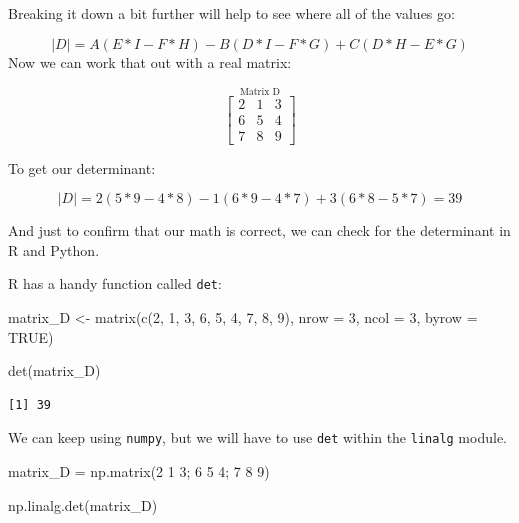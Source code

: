 \documentclass[
  letterpaper,
]{krantz}
\newenvironment{Shaded}{}{}
\newcommand{\AttributeTok}[1]{\textcolor[rgb]{0.49,0.56,0.16}{#1}}
\newcommand{\ConstantTok}[1]{\textcolor[rgb]{0.53,0.00,0.00}{#1}}
\newcommand{\DecValTok}[1]{\textcolor[rgb]{0.25,0.63,0.44}{#1}}
\newcommand{\FunctionTok}[1]{\textcolor[rgb]{0.02,0.16,0.49}{#1}}
\newcommand{\NormalTok}[1]{#1}
\newcommand{\OperatorTok}[1]{\textcolor[rgb]{0.40,0.40,0.40}{#1}}
\newcommand{\OtherTok}[1]{\textcolor[rgb]{0.00,0.44,0.13}{#1}}
\newcommand{\StringTok}[1]{\textcolor[rgb]{0.25,0.44,0.63}{#1}}
\begin{document}
Breaking it down a bit further will help to see where all of the values
go:

\[
\mid D \mid = A(E*I - F*H) - B(D*I - F*G) + C(D*H - E*G)
\] Now we can work that out with a real matrix:

\[
\stackrel{\mbox{Matrix D}}{
\begin{bmatrix}
2 & 1 & 3\\
6 & 5 & 4\\
7 & 8 & 9
\end{bmatrix}
}
\]

To get our determinant:

\[
\mid D \mid = 2(5*9 - 4*8) - 1(6*9 - 4*7) + 3(6*8 - 5*7) = 39
\]

And just to confirm that our math is correct, we can check for the
determinant in R and Python.

R has a handy function called \texttt{det}:

\begin{Shaded}
\begin{Highlighting}[]
\NormalTok{matrix\_D }\OtherTok{\textless{}{-}} \FunctionTok{matrix}\NormalTok{(}\FunctionTok{c}\NormalTok{(}\DecValTok{2}\NormalTok{, }\DecValTok{1}\NormalTok{, }\DecValTok{3}\NormalTok{,}
                     \DecValTok{6}\NormalTok{, }\DecValTok{5}\NormalTok{, }\DecValTok{4}\NormalTok{,}
                     \DecValTok{7}\NormalTok{, }\DecValTok{8}\NormalTok{, }\DecValTok{9}\NormalTok{), }
                   \AttributeTok{nrow =} \DecValTok{3}\NormalTok{, }
                   \AttributeTok{ncol =} \DecValTok{3}\NormalTok{, }
                   \AttributeTok{byrow =} \ConstantTok{TRUE}\NormalTok{)}

\FunctionTok{det}\NormalTok{(matrix\_D)}
\end{Highlighting}
\end{Shaded}

\begin{verbatim}
[1] 39
\end{verbatim}

We can keep using \texttt{numpy}, but we will have to use \texttt{det}
within the \texttt{linalg} module.

\begin{Shaded}
\begin{Highlighting}[]
\NormalTok{matrix\_D }\OperatorTok{=}\NormalTok{ np.matrix(}\StringTok{\textquotesingle{}2 1 3; 6 5 4; 7 8 9\textquotesingle{}}\NormalTok{)}

\NormalTok{np.linalg.det(matrix\_D)}
\end{Highlighting}
\end{Shaded}
\end{document}
